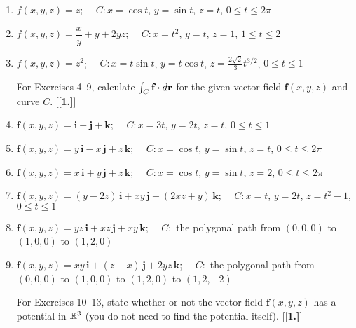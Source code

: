 \begin{enumerate}[\bfseries 1.]
 \item $f(x,y,z)=z$; $\quad C: x=\cos t$, $y=\sin t$, $z=t$, $0 \le t \le 2\pi$
 \item $f(x,y,z)=\dfrac{x}{y} + y + 2yz$; $\quad C: x=t^2$, $y=t$, $z=1$, $1 \le t \le 2$
 \item $f(x,y,z)=z^2$; $\quad C: x=t\sin t$, $y=t\cos t$, $z=\frac{2\sqrt{2}}{3}t^{3/2}$, $0 \le t \le 1$
\par\noindent For Exercises 4--9, calculate $\int_C \textbf{f} \bm{\cdot} d\textbf{r}$ for the given vector
 field $\textbf{f}(x,y,z)$ and curve $C$.
[{[\bfseries 1.]}]
 \item $\textbf{f}(x,y,z) = \textbf{i} - \textbf{j} + \textbf{k}$; $\quad C: x=3t$, $y=2t$, $z=t$, $0 \le t \le 1$
 \item $\textbf{f}(x,y,z) = y\,\textbf{i} - x\,\textbf{j} + z\,\textbf{k}$; $\quad C: x=\cos t$, $y=\sin t$, $z=t$,
  $0 \le t \le 2\pi$
 \item $\textbf{f}(x,y,z) = x\,\textbf{i} + y\,\textbf{j} + z\,\textbf{k}$; $\quad C: x=\cos t$, $y=\sin t$, $z=2$,
  $0 \le t \le 2\pi$
 \item $\textbf{f}(x,y,z) = (y-2z)\,\textbf{i} + xy\,\textbf{j} + (2xz+y)\,\textbf{k}$; $\quad C: x=t$, $y=2t$,
  $z = t^2 - 1$, $0 \le t \le 1$
 \item $\textbf{f}(x,y,z) = yz\,\textbf{i} + xz\,\textbf{j} + xy\,\textbf{k}$; $\quad C:$ the polygonal path from
  $(0,0,0)$ to $(1,0,0)$ to $(1,2,0)$
 \item $\textbf{f}(x,y,z) = xy\,\textbf{i} + (z-x)\,\textbf{j} + 2yz\,\textbf{k}$; $\quad C:$ the polygonal path from
  $(0,0,0)$ to $(1,0,0)$ to $(1,2,0)$ to $(1,2,-2)$
\par\noindent For Exercises 10--13, state whether or not the vector field $\textbf{f}(x,y,z)$ has a potential in
$\mathbb{R}^{3}$ (you do not need to find the potential itself).
[{[\bfseries 1.]}]
\end{enumerate}
